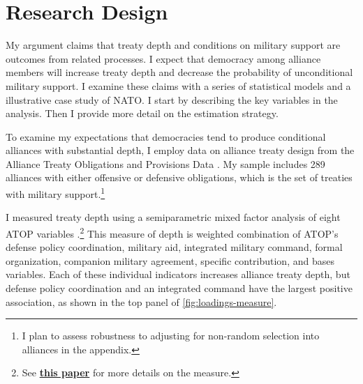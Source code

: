 \documentclass[12pt]{article}
\begin{document}
\section{Research Design}


My argument claims that treaty depth and conditions on military support are outcomes from related processes. 
I expect that democracy among alliance members will increase treaty depth and decrease the probability of unconditional military support. 
I examine these claims with a series of statistical models and a illustrative case study of NATO. 
I start by describing the key variables in the analysis. 
Then I provide more detail on the estimation strategy. 


To examine my expectations that democracies tend to produce conditional alliances with substantial depth, I employ data on alliance treaty design from the Alliance Treaty Obligations and Provisions Data \citep{Leedsetal2002}. 
My sample includes 289 alliances with either offensive or defensive obligations, which is the set of treaties with military support.\footnote{I plan to assess robustness to adjusting for non-random selection into alliances in the appendix.} 


I measured treaty depth using a semiparametric mixed factor analysis of eight ATOP variables \citep{Murrayetal2013}.\footnote{See \textbf{\href{https://github.com/joshuaalley/arms-allies/blob/master/manuscript/arms-allies-paper.pdf}{this paper}} for more details on the measure.}
This measure of depth is weighted combination of ATOP's defense policy coordination, military aid, integrated military command, formal organization, companion military agreement, specific contribution, and bases variables. 
Each of these individual indicators increases alliance treaty depth, but defense policy coordination and an integrated command have the largest positive association, as shown in the top panel of \autoref{fig:loadings-measure}. 
\end{document}
